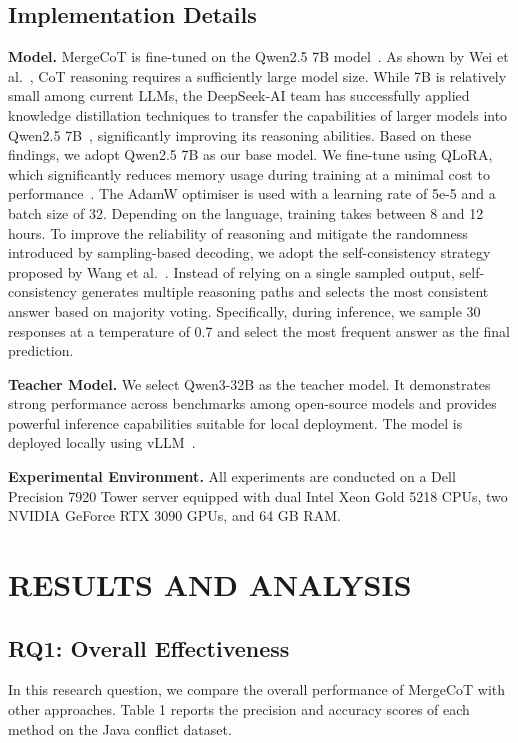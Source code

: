 \documentclass[sigconf,review,anonymous]{acmart}
\begin{document}
\subsection{Implementation Details}
\textbf{Model.} MergeCoT is fine-tuned on the Qwen2.5 7B model~\cite{qwen25}. As shown by Wei et al.~\cite{cot}, CoT reasoning requires a sufficiently large model size. 
While 7B is relatively small among current LLMs, the DeepSeek-AI team has successfully applied knowledge distillation techniques to transfer the capabilities of larger models into Qwen2.5 7B~\cite{deepseekr1}, significantly improving its reasoning abilities. Based on these findings, we adopt Qwen2.5 7B as our base model. 
We fine-tune using QLoRA, which significantly reduces memory usage during training at a minimal cost to performance~\cite{qlora}. 
The AdamW optimiser is used with a learning rate of 5e-5 and a batch size of 32. 
Depending on the language, training takes between 8 and 12 hours. To improve the reliability of reasoning and mitigate the randomness introduced by sampling-based decoding, we adopt the self-consistency strategy proposed by Wang et al.~\cite{wang2022selfconsistencyArXiv}. Instead of relying on a single sampled output, self-consistency generates multiple reasoning paths and selects the most consistent answer based on majority voting. Specifically, during inference, we sample 30 responses at a temperature of 0.7 and select the most frequent answer as the final prediction.

\textbf{Teacher Model.} We select Qwen3-32B as the teacher model. It demonstrates strong performance across benchmarks among open-source models and provides powerful inference capabilities suitable for local deployment. The model is deployed locally using vLLM~\cite{vllmArXiv}.

\textbf{Experimental Environment.} All experiments are conducted on a Dell Precision 7920 Tower server equipped with dual Intel Xeon Gold 5218 CPUs, two NVIDIA GeForce RTX 3090 GPUs, and 64 GB RAM.

\section{RESULTS AND ANALYSIS}
\subsection{RQ1: Overall Effectiveness}
In this research question, we compare the overall performance of MergeCoT with other approaches. Table 1 reports the precision and accuracy scores of each method on the Java conflict dataset.
\end{document}
